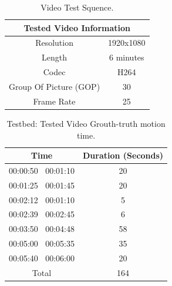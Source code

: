 \begin{table}[]
\centering
\caption{Video Test Squence.}
\label{tab:videotest}
\begin{tabular}{|c|c|}
\hline
\multicolumn{2}{|c|}{\textbf{Tested Video Information}} \\ \hline
Resolution                        & 1920x1080           \\ \hline
Length                            & 6 minutes           \\ \hline
Codec                             & H264                \\ \hline
Group Of Picture (GOP)            & 30                  \\ \hline
Frame Rate                        & 25                  \\ \hline
\end{tabular}
\end{table}
\begin{table}[]
\centering
\caption{Testbed: Tested Video Grouth-truth motion time.}
\label{tab:motiontime}
\begin{tabular}{|c|c|}
\hline
\textbf{Time}       & \textbf{Duration (Seconds)} \\ \hline
00:00:50 $~$ 00:01:10 & 20                          \\ \hline
00:01:25 $~$ 00:01:45 & 20                          \\ \hline
00:02:12 $~$ 00:01:10 & 5                           \\ \hline
00:02:39 $~$ 00:02:45 & 6                           \\ \hline
00:03:50 $~$ 00:04:48 & 58                          \\ \hline
00:05:00 $~$ 00:05:35 & 35                          \\ \hline
00:05:40 $~$ 00:06:00 & 20                          \\ \hline
Total               & 164                         \\ \hline
\end{tabular}
\end{table}
